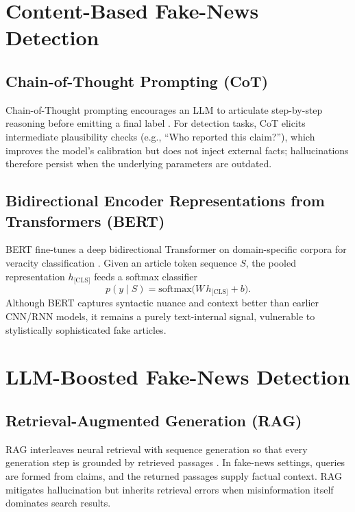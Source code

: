 \section{Content-Based Fake-News Detection}\label{sec:content}

\subsection{Chain-of-Thought Prompting (CoT)}
Chain-of-Thought prompting encourages an LLM to articulate step-by-step reasoning before emitting a final label \cite{wei2023cot}.  
For detection tasks, CoT elicits intermediate plausibility checks (e.g., “Who reported this claim?”), which improves the model’s calibration but does not inject external facts; hallucinations therefore persist when the underlying parameters are outdated.

\subsection{Bidirectional Encoder Representations from Transformers (BERT)}
BERT fine-tunes a deep bidirectional Transformer on domain-specific corpora for veracity classification \cite{devlin-etal-2019-bert}.  
Given an article token sequence $S$, the pooled representation $h_{\text{[CLS]}}$ feeds a softmax classifier
\[
p(y\mid S) = 
   \text{softmax}\!\bigl(W\,h_{\text{[CLS]}} + b\bigr).
\]
Although BERT captures syntactic nuance and context better than earlier CNN/RNN models, it remains a purely text-internal signal, vulnerable to stylistically sophisticated fake articles.

\section{LLM-Boosted Fake-News Detection}\label{sec:llm}

\subsection{Retrieval-Augmented Generation (RAG)}
RAG interleaves neural retrieval with sequence generation so that every generation step is grounded by retrieved passages \cite{lewis2020rag}.  
In fake-news settings, queries are formed from claims, and the returned passages supply factual context.  
RAG mitigates hallucination but inherits retrieval errors when misinformation itself dominates search results.

